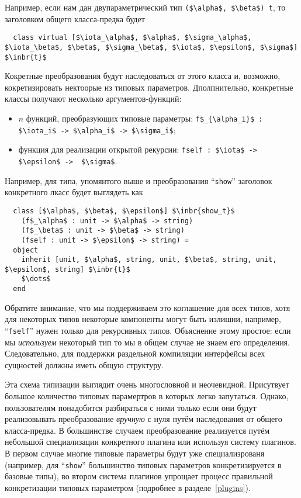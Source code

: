 Например, если нам дан двупараметрический тип \lstinline{($\alpha$, $\beta$) t}, то заголовком общего класса-предка будет 

\begin{lstlisting}
  class virtual [$\iota_\alpha$, $\alpha$, $\sigma_\alpha$, $\iota_\beta$, $\beta$, $\sigma_\beta$, $\iota$, $\epsilon$, $\sigma$] $\inbr{t}$
\end{lstlisting}

Кокретные преобразования будут наследоваться от этого класса и, возможно, кокретизировать нектоорые из типовых параметров.
Дполпнительно, конкретные классы получают несколько аргументов-функций:

\begin{itemize}
\item $n$ функций, преобразующих типовые параметры: \lstinline|f$_{\alpha_i}$ : $\iota_i$ -> $\alpha_i$ -> $\sigma_i$|;
\item функция для реализации открытой рекурсии: \lstinline|fself : $\iota$ -> $\epsilon$ ->  $\sigma$|.
\end{itemize}

Например, для типа, упомянтого выше и преобразования ``\lstinline{show}'' заголовок конкретного лкасс будет выглядеть как

\begin{lstlisting}
  class [$\alpha$, $\beta$, $\epsilon$] $\inbr{show_t}$ 
    (f$_\alpha$ : unit -> $\alpha$ -> string)
    (f$_\beta$ : unit -> $\beta$ -> string)
    (fself : unit -> $\epsilon$ -> string) =
  object 
    inherit [unit, $\alpha$, string, unit, $\beta$, string, unit, $\epsilon$, string] $\inbr{t}$
    $\dots$
  end 
\end{lstlisting}

Обратите внимание, что мы поддерживаем это коглашение для всех типов, хотя для некоторых типов некоторые компоненты могут быть излишни, например, ``\lstinline{fself}''
нужен только для рекурсивных типов. Объяснение этому простое: если мы \emph{используем} некоторый тип
то мы в общем случае не знаем его определения. Следовательно, для поддержки раздельной компиляции интерфейсы всех сущностей должны иметь общую структуру.

Эта схема типизации выглядит очень многословной и неочевидной. Присутвует большое количество типовых парамертров в которых легко запутаться.
Однако, пользователям понадобится разбираться с ними только если они будут реализовывать преобразование \emph{вручную} с нуля путём 
наследования от общего класса-предка.
В большинстве случаем преобразование реализуется путём небольшой специализации конкретного плагина или используя систему плагинов. 
В первом случае многие типовые параметры будут уже специализрованя (например, для  ``\lstinline{show}'' большинство типовых параметров конкретизируется в базовые типы), во втором система плагинов упрощает процесс правильной конкретизации типовых параметром (подробнее в 
разделе~\ref{plugins}).

